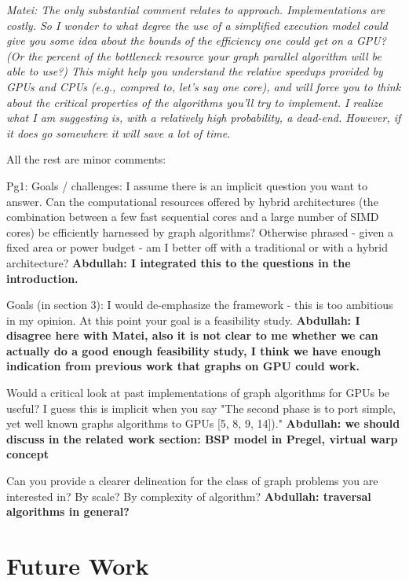 \documentclass{acm_proc_article-sp}[12pt]
\begin{document}
{\em Matei: The only substantial comment relates to approach.  Implementations are costly. So I wonder to what degree the use of a simplified execution model could give you some idea about the bounds of the efficiency one could get on a GPU?   (Or the percent of the bottleneck resource your graph parallel algorithm will be able to use?)  This might help you understand the relative speedups provided by GPUs and CPUs (e.g., compred to, let's say one core), and will force you to think about the critical properties of the algorithms you'll try to implement.   I realize what I am suggesting is, with a relatively high probability, a dead-end.  However, if it does go somewhere it will save a lot of  time.
 
All the rest are minor comments:
 
Pg1: Goals / challenges: I assume there is an implicit question you want to answer.  Can the computational resources offered by hybrid architectures (the combination between a few fast sequential cores and a large number of SIMD cores) be efficiently harnessed by graph algorithms? Otherwise phrased - given a fixed area or power budget - am I better off with a traditional or with a hybrid architecture? \textbf{Abdullah: I integrated this to the questions in the introduction.}
 
Goals (in section 3): I would de-emphasize the framework - this is too ambitious in my opinion. At this point your goal is a feasibility study. \textbf{Abdullah: I disagree here with Matei, also it is not clear to me whether we can actually do a good enough feasibility study, I think we have enough indication from previous work that graphs on GPU could work.}

Would a critical look at past implementations of graph algorithms for GPUs be useful?  I guess this is implicit when you say "The second phase is to port simple, yet well known graphs algorithms to GPUs [5, 8, 9, 14])." \textbf{Abdullah: we should discuss in the related work section: BSP model in Pregel, virtual warp concept}
 
Can you provide a clearer delineation for the class of graph problems you are interested in? By scale? By complexity of algorithm? \textbf{Abdullah: traversal algorithms in general?}
}

\section{Future Work}
\label{sec:future}
\end{document}

